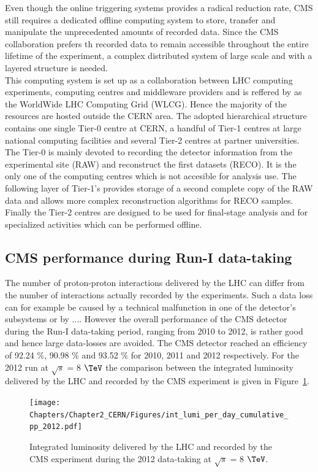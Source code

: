 Even though the online triggering systems provides a radical reduction rate, CMS still requires a dedicated offline computing system to store, transfer and manipulate the unprecedented amounts of recorded data. Since the CMS collaboration prefers th recorded data to remain accessible throughout the entire lifetime of the experiment, a complex distributed system of large scale and with a layered structure is needed.
\\
This computing system is set up as a collaboration between LHC computing experiments, computing centres and middleware providers and is reffered by as the WorldWide LHC Computing Grid (WLCG). Hence the majority of the resources are hosted outside the CERN area. The adopted hierarchical structure contains one single Tier-0 centre at CERN, a handful of Tier-1 centres at large national computing facilities and several Tier-2 centres at partner universities. The Tier-0 is mainly devoted to recording the detector information from the experimental site (RAW) and reconstruct the first datasets (RECO). It is the only one of the computing centres which is not accesible for analysis use. The following layer of Tier-1's provides storage of a second complete copy of the RAW data and allows more complex reconstruction algorithms for RECO samples. Finally the Tier-2 centres are designed to be used for final-stage analysis and for specialized activities which can be performed offline.

\subsection{CMS performance during Run-I data-taking}

The number of proton-proton interactions delivered by the LHC can differ from the number of interactions actually recorded by the experiments. 
Such a data loss can for example be caused by a technical malfunction in one of the detector's subsystems or by .... However the overall performance of the CMS detector during the Run-I data-taking period, ranging from 2010 to 2012, is rather good and hence large data-losses are avoided. 
The CMS detector reached an efficiency of 92.24 $\%$, 90.98 $\%$ and 93.52 $\%$ for 2010, 2011 and 2012 respectively. For the 2012 run at $\sqrt{s}$ = 8 $\TeV$ the comparison between the integrated luminosity delivered by the LHC and recorded by the CMS experiment is given in Figure~\ref{fig::LumiEff}.

\begin{figure}[h!t]
 \centering
 \texttt{[image: Chapters/Chapter2\_CERN/Figures/int\_lumi\_per\_day\_cumulative\_pp\_2012.pdf]}
 \caption{Integrated luminosity delivered by the LHC and recorded by the CMS experiment during the 2012 data-taking at $\sqrt{s}$ = 8 $\TeV$.} \label{fig::LumiEff}
\end{figure}

